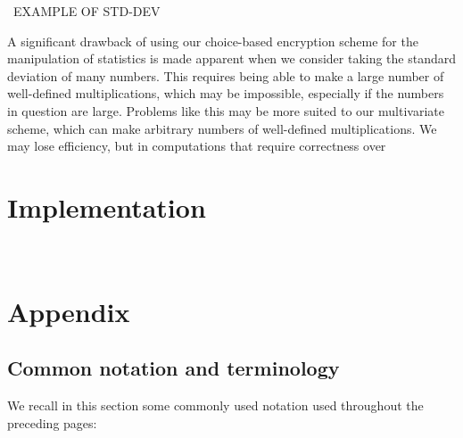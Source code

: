 \documentclass[11pt]{report}
\begin{document}
\ EXAMPLE OF STD-DEV

A significant drawback of using our choice-based encryption scheme for the manipulation of statistics is made apparent when we consider taking the standard deviation of many numbers. This requires being able to make a large number of well-defined multiplications, which may be impossible, especially if the numbers in question are large. Problems like this may be more suited to our multivariate scheme, which can make arbitrary numbers of well-defined multiplications. We may lose efficiency, but in computations that require correctness over

\chapter{Implementation}
\label{chap:implementation}

\

\chapter{Appendix}

\section{Common notation and terminology}

We recall in this section some commonly used notation used throughout the preceding pages:
\end{document}
